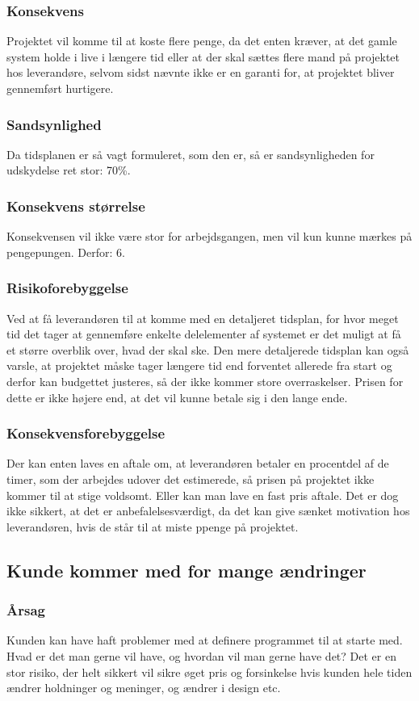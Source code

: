 \documentclass[10pt,a4paper,danish]{article}
\begin{document}
\subsubsection{Konsekvens}
Projektet vil komme til at koste flere penge, da det enten kræver, at det gamle system holde i live i længere tid eller at der skal sættes flere mand på projektet hos leverandøre, selvom sidst nævnte ikke er en garanti for, at projektet bliver gennemført hurtigere.
\subsubsection{Sandsynlighed}
Da tidsplanen er så vagt formuleret, som den er, så er sandsynligheden for udskydelse ret stor: 70\%.
\subsubsection{Konsekvens størrelse}
Konsekvensen vil ikke være stor for arbejdsgangen, men vil kun kunne mærkes på pengepungen. Derfor: 6.
\subsubsection{Risikoforebyggelse}
Ved at få leverandøren til at komme med en detaljeret tidsplan, for hvor meget tid det tager at gennemføre enkelte delelementer af systemet er det muligt at få et større overblik over, hvad der skal ske.
Den mere detaljerede tidsplan kan også varsle, at projektet måske tager længere tid end forventet allerede fra start og derfor kan budgettet justeres, så der ikke kommer store overraskelser.
Prisen for dette er ikke højere end, at det vil kunne betale sig i den lange ende.
\subsubsection{Konsekvensforebyggelse}
Der kan enten laves en aftale om, at leverandøren betaler en procentdel af de timer, som der arbejdes udover det estimerede, så prisen på projektet ikke kommer til at stige voldsomt.
Eller kan man lave en fast pris aftale. Det er dog ikke sikkert, at det er anbefalelsesværdigt, da det kan give sænket motivation hos leverandøren, hvis de står til at miste ppenge på projektet.


\subsection{Kunde kommer med for mange ændringer}
\subsubsection{Årsag}
Kunden kan have haft problemer med at definere programmet til at starte med. Hvad er det man gerne vil have, og hvordan vil man gerne have det? Det er en stor risiko, der helt sikkert vil sikre øget pris og forsinkelse hvis kunden hele tiden ændrer holdninger og meninger, og ændrer i design etc.
\end{document}
